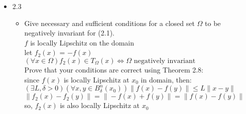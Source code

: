 \documentclass[12pt,letter]{article}
\newcommand{\R}{\mathbb{R}}
\begin{document}
\begin{itemize}
\begin{itemize}
  

  
  \end{itemize}

  \pagebreak
  
\item 2.3
  \begin{itemize}
    \item Give necessary and sufficient conditions for a closed set $\Omega$ to be negatively invariant for (2.1).\\

      $f$ is locally Lipschitz on the domain\\
      let $f_2(x)$ = $-f(x)$\\
      $(\forall x \in \Omega)  f_2(x) \in T_{\Omega}(x) \iff \Omega \text{ negatively invariant}$\\

      Prove that your conditions are correct using Theorem 2.8:\\

      since $f(x)$ is locally Lipschitz at $x_0$ in domain, then:\\
      $(\exists L, \delta >0)(\forall x,y \in B_{\delta}^n(x_0)) \|f(x)-f(y)\| \leq L \|x-y\|$\\

      $\|f_2(x)-f_2(y)\|=\|-f(x)+f(y)\|=\|f(x)-f(y)\|$\\
      so, $f_2(x)$ is also locally Lipschitz at $x_0$\\


\end{itemize}
\end{itemize}
\end{document}
